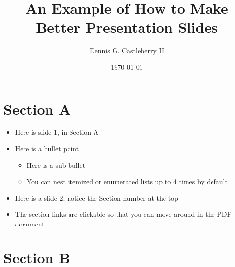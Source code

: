 \documentclass{beamer}
\begin{document}
 \begin{frame}
 \title{An Example of How to Make Better Presentation Slides}
 \author{Dennis G. Castleberry II}
 \date{\today}
 \maketitle
 \end{frame}

 \begin{frame}[allowframebreaks]
   \tableofcontents
 \end{frame}

 \section{Section A}

 \begin{frame}
   \begin{itemize}
     \item Here is slide 1, in Section A
     \item Here is a bullet point
     \begin{itemize}
       \item Here is a sub bullet
       \item You can nest itemized or enumerated lists up to 4 times 
             by default
     \end{itemize}
   \end{itemize}
 \end{frame}

 \begin{frame}
   \begin{itemize}
     \item Here is a slide 2; notice the Section number at the top
     \item The section links are clickable so that you can move around
           in the PDF document 
   \end{itemize}
 \end{frame}

 \section{Section B}
 
\end{document}
